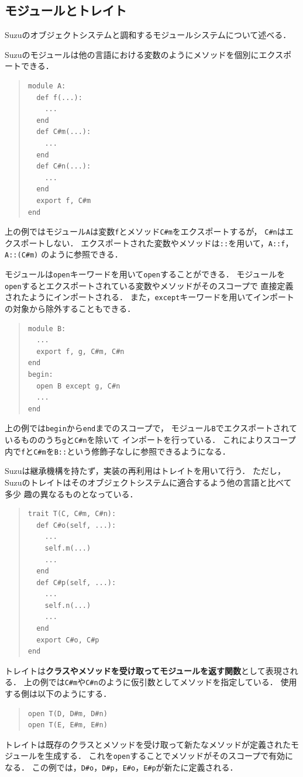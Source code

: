 \documentclass{ipsjprosym}
\begin{document}
\subsection{モジュールとトレイト}

Suzuのオブジェクトシステムと調和するモジュールシステムについて述べる．

Suzuのモジュールは他の言語における変数のようにメソッドを個別にエクスポートできる．
\begin{quote}
\begin{verbatim}
module A:
  def f(...):
    ...
  end
  def C#m(...):
    ...
  end
  def C#n(...):
    ...
  end
  export f, C#m
end
\end{verbatim}
\end{quote}
上の例ではモジュール\verb|A|は変数\verb|f|とメソッド\verb|C#m|をエクスポートするが，
\verb|C#n|はエクスポートしない．
エクスポートされた変数やメソッドは\verb|::|を用いて，\verb|A::f|，\verb|A::(C#m)|
のように参照できる．

モジュールは\verb|open|キーワードを用いて\verb|open|することができる．
モジュールを\verb|open|するとエクスポートされている変数やメソッドがそのスコープで
直接定義されたようにインポートされる．
また，\verb|except|キーワードを用いてインポートの対象から除外することもできる．
\begin{quote}
\begin{verbatim}
module B:
  ...
  export f, g, C#m, C#n
end
begin:
  open B except g, C#n
  ...
end
\end{verbatim}
\end{quote}
上の例では\verb|begin|から\verb|end|までのスコープで，
モジュール\verb|B|でエクスポートされているもののうち\verb|g|と\verb|C#n|を除いて
インポートを行っている．
これによりスコープ内で\verb|f|と\verb|C#m|を\verb|B::|という修飾子なしに参照できるようになる．

Suzuは継承機構を持たず，実装の再利用はトレイト\cite{Scharli:2003}を用いて行う．
ただし，Suzuのトレイトはそのオブジェクトシステムに適合するよう他の言語と比べて多少
趣の異なるものとなっている．
\begin{quote}
\begin{verbatim}
trait T(C, C#m, C#n):
  def C#o(self, ...):
    ...
    self.m(...)
    ...
  end
  def C#p(self, ...):
    ...
    self.n(...)
    ...
  end
  export C#o, C#p
end
\end{verbatim}
\end{quote}
トレイトは\textbf{クラスやメソッドを受け取ってモジュールを返す関数}として表現される．
上の例では\verb|C#m|や\verb|C#n|のように仮引数としてメソッドを指定している．
使用する側は以下のようにする．
\begin{quote}
\begin{verbatim}
open T(D, D#m, D#n)
open T(E, E#m, E#n)
\end{verbatim}
\end{quote}
トレイトは既存のクラスとメソッドを受け取って新たなメソッドが定義されたモジュールを生成する．
これを\verb|open|することでメソッドがそのスコープで有効になる．
この例では，\verb|D#o|，\verb|D#p|，\verb|E#o|，\verb|E#p|が新たに定義される．
\end{document}
